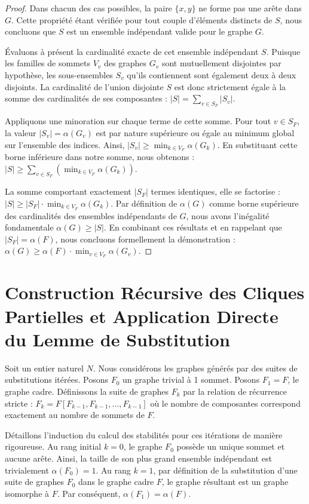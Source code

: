 \documentclass[11pt, a4paper]{article}
\begin{document}
\begin{proof}
Dans chacun des cas possibles, la paire $\{x, y\}$ ne forme pas une arête dans $G$.
Cette propriété étant vérifiée pour tout couple d'éléments distincts de $S$, nous concluons que $S$ est un ensemble indépendant valide pour le graphe $G$.

Évaluons à présent la cardinalité exacte de cet ensemble indépendant $S$.
Puisque les familles de sommets $V_v$ des graphes $G_v$ sont mutuellement disjointes par hypothèse, les sous-ensembles $S_v$ qu'ils contiennent sont également deux à deux disjoints.
La cardinalité de l'union disjointe $S$ est donc strictement égale à la somme des cardinalités de ses composantes : $|S| = \sum_{v \in S_F} |S_v|$.

Appliquons une minoration sur chaque terme de cette somme.
Pour tout $v \in S_F$, la valeur $|S_v| = \alpha(G_v)$ est par nature supérieure ou égale au minimum global sur l'ensemble des indices. Ainsi, $|S_v| \ge \min_{k \in V_F} \alpha(G_k)$.
En substituant cette borne inférieure dans notre somme, nous obtenons :
$|S| \ge \sum_{v \in S_F} \left( \min_{k \in V_F} \alpha(G_k) \right)$.

La somme comportant exactement $|S_F|$ termes identiques, elle se factorise :
$|S| \ge |S_F| \cdot \min_{k \in V_F} \alpha(G_k)$.
Par définition de $\alpha(G)$ comme borne supérieure des cardinalités des ensembles indépendants de $G$, nous avons l'inégalité fondamentale $\alpha(G) \ge |S|$.
En combinant ces résultats et en rappelant que $|S_F| = \alpha(F)$, nous concluons formellement la démonstration :
$\alpha(G) \ge \alpha(F) \cdot \min_{v \in V_F} \alpha(G_v)$.
\end{proof}

\newpage
\section{Construction Récursive des Cliques Partielles et Application Directe du Lemme de Substitution}

Soit un entier naturel $N$. Nous considérons les graphes générés par des suites de substitutions itérées.
Posons $F_0$ un graphe trivial à 1 sommet. Posons $F_1 = F$, le graphe cadre.
Définissons la suite de graphes $F_k$ par la relation de récurrence stricte :
$F_k = F[F_{k-1}, F_{k-1}, \dots, F_{k-1}]$ où le nombre de composantes correspond exactement au nombre de sommets de $F$.

Détaillons l'induction du calcul des stabilités pour ces itérations de manière rigoureuse.
Au rang initial $k=0$, le graphe $F_0$ possède un unique sommet et aucune arête. Ainsi, la taille de son plus grand ensemble indépendant est trivialement $\alpha(F_0) = 1$.
Au rang $k=1$, par définition de la substitution d'une suite de graphes $F_0$ dans le graphe cadre $F$, le graphe résultant est un graphe isomorphe à $F$. Par conséquent, $\alpha(F_1) = \alpha(F)$.
\end{document}
